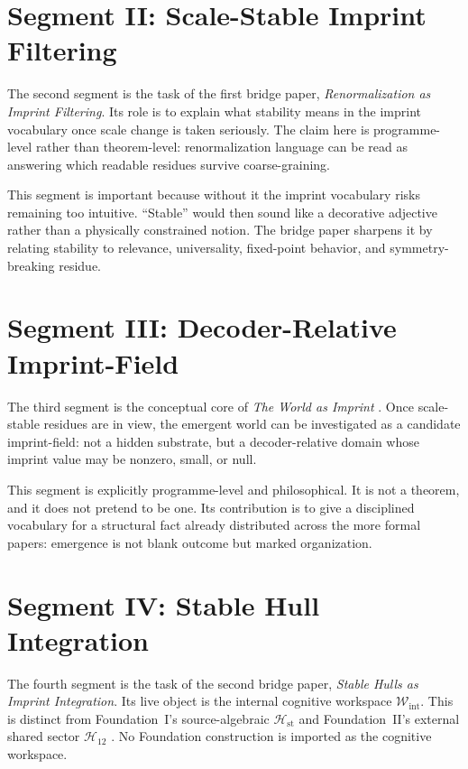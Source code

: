 \documentclass[12pt,a4paper]{article}
\begin{document}
\section{Segment II: Scale-Stable Imprint Filtering}

The second segment is the task of the first bridge paper, \emph{Renormalization as Imprint Filtering}. Its role is to explain what stability means in the imprint vocabulary once scale change is taken seriously. The claim here is programme-level rather than theorem-level: renormalization language can be read as answering which readable residues survive coarse-graining.

This segment is important because without it the imprint vocabulary risks remaining too intuitive. ``Stable'' would then sound like a decorative adjective rather than a physically constrained notion. The bridge paper sharpens it by relating stability to relevance, universality, fixed-point behavior, and symmetry-breaking residue.

\section{Segment III: Decoder-Relative Imprint-Field}

The third segment is the conceptual core of \emph{The World as Imprint} \cite{WorldImprint}. Once scale-stable residues are in view, the emergent world can be investigated as a candidate imprint-field: not a hidden substrate, but a decoder-relative domain whose imprint value may be nonzero, small, or null.

This segment is explicitly programme-level and philosophical. It is not a theorem, and it does not pretend to be one. Its contribution is to give a disciplined vocabulary for a structural fact already distributed across the more formal papers: emergence is not blank outcome but marked organization.

\section{Segment IV: Stable Hull Integration}

The fourth segment is the task of the second bridge paper,
\emph{Stable Hulls as Imprint Integration}. Its live object is the
internal cognitive workspace \(\mathcal W_{\mathrm{int}}\). This is
distinct from Foundation~I's source-algebraic
\(\mathcal H_{\mathrm{st}}\) and Foundation~II's external shared sector
\(\mathcal H_{12}\) \cite{FoundationII,BrainAnchor}. No Foundation
construction is imported as the cognitive workspace.
\end{document}
